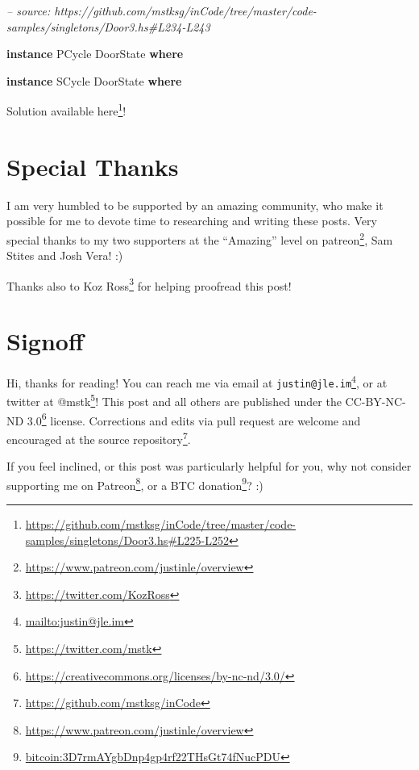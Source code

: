 \documentclass[]{article}
\newenvironment{Shaded}{}{}
\newcommand{\CommentTok}[1]{\textcolor[rgb]{0.38,0.63,0.69}{\textit{#1}}}
\newcommand{\DataTypeTok}[1]{\textcolor[rgb]{0.56,0.13,0.00}{#1}}
\newcommand{\KeywordTok}[1]{\textcolor[rgb]{0.00,0.44,0.13}{\textbf{#1}}}
\renewcommand{\href}[2]{#2\footnote{\url{#1}}}
\begin{document}
\begin{enumerate}
\begin{Shaded}
\begin{Highlighting}[]
\CommentTok{-- source: https://github.com/mstksg/inCode/tree/master/code-samples/singletons/Door3.hs#L234-L243}

\KeywordTok{instance} \DataTypeTok{PCycle} \DataTypeTok{DoorState} \KeywordTok{where}

\KeywordTok{instance} \DataTypeTok{SCycle} \DataTypeTok{DoorState} \KeywordTok{where}
\end{Highlighting}
\end{Shaded}

  Solution available
  \href{https://github.com/mstksg/inCode/tree/master/code-samples/singletons/Door3.hs\#L225-L252}{here}!
\end{enumerate}

\hypertarget{special-thanks}{%
\section{Special Thanks}\label{special-thanks}}

I am very humbled to be supported by an amazing community, who make it possible
for me to devote time to researching and writing these posts. Very special
thanks to my two supporters at the ``Amazing'' level on
\href{https://www.patreon.com/justinle/overview}{patreon}, Sam Stites and Josh
Vera! :)

Thanks also to \href{https://twitter.com/KozRoss}{Koz Ross} for helping
proofread this post!

\hypertarget{signoff}{%
\section{Signoff}\label{signoff}}

Hi, thanks for reading! You can reach me via email at
\href{mailto:justin@jle.im}{\nolinkurl{justin@jle.im}}, or at twitter at
\href{https://twitter.com/mstk}{@mstk}! This post and all others are published
under the \href{https://creativecommons.org/licenses/by-nc-nd/3.0/}{CC-BY-NC-ND
3.0} license. Corrections and edits via pull request are welcome and encouraged
at \href{https://github.com/mstksg/inCode}{the source repository}.

If you feel inclined, or this post was particularly helpful for you, why not
consider \href{https://www.patreon.com/justinle/overview}{supporting me on
Patreon}, or a \href{bitcoin:3D7rmAYgbDnp4gp4rf22THsGt74fNucPDU}{BTC donation}?
:)
\end{document}

